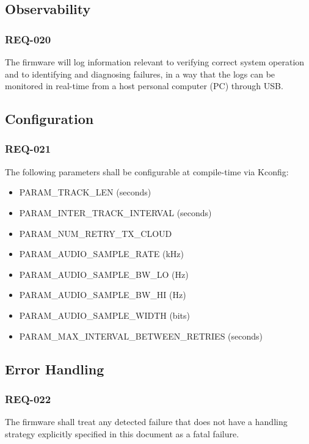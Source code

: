 \documentclass[11pt,a4paper]{article}
\begin{document}
\subsection{Observability}

\subsubsection{REQ-020}

The firmware will log information relevant to verifying correct system operation
and to identifying and diagnosing failures, in a way that the logs can be
monitored in real-time from a host personal computer (PC) through USB.

\subsection{Configuration}

\subsubsection{REQ-021}

The following parameters shall be configurable at compile-time via Kconfig:

\begin{itemize}
    \item PARAM\_TRACK\_LEN (seconds)
    \item PARAM\_INTER\_TRACK\_INTERVAL (seconds)
    \item PARAM\_NUM\_RETRY\_TX\_CLOUD
    \item PARAM\_AUDIO\_SAMPLE\_RATE (kHz)
    \item PARAM\_AUDIO\_SAMPLE\_BW\_LO (Hz)
    \item PARAM\_AUDIO\_SAMPLE\_BW\_HI (Hz)
    \item PARAM\_AUDIO\_SAMPLE\_WIDTH (bits)
    \item PARAM\_MAX\_INTERVAL\_BETWEEN\_RETRIES (seconds)
\end{itemize}

\subsection{Error Handling}

\subsubsection{REQ-022}

The firmware shall treat any detected failure that does not have a handling
strategy explicitly specified in this document as a fatal failure.
\end{document}
